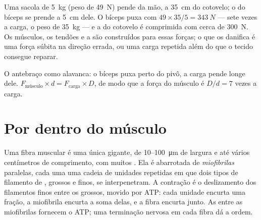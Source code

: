 \begin{example}\label{ex:g10:muscles-and-joints:bag}
Uma sacola de \qty{5}{kg} (peso de \qty{49}{N}) pende da mão, a
\qty{35}{cm} do cotovelo; o  do bíceps se prende a \qty{5}{cm}
dele. O bíceps puxa com $49 \times 35/5 = \qty{343}{N}$ --- sete vezes
a carga, o peso de \qty{35}{kg} --- e a  do cotovelo é
comprimida com cerca de \qty{300}{N}. Os músculos, os tendões e a
 são construídos para essas forças; o que os danifica é uma
força súbita na direção errada, ou uma carga repetida além do que o
tecido consegue reparar.
\end{example}

\begin{omfigure}

{\small O antebraço como alavanca: o bíceps puxa perto do pivô, a carga
pende longe dele. $F_{\text{músculo}} \times d =
F_{\text{carga}} \times D$, de modo que a força do músculo é $D/d = 7$
vezes a carga.}
\end{omfigure}

\section{Por dentro do músculo}

\begin{proposition}\label{prop:g10:muscles-and-joints:fibre}
Uma fibra muscular é uma única  gigante, de
\num{10}--\qty{100}{\micro m} de largura e até vários centímetros de
comprimento, com muitos . Ela é abarrotada de
\emph{miofibrilas} paralelas, cada uma uma cadeia de unidades
repetidas em que dois tipos de filamento de , grossos e finos,
se interpenetram. A contração é o deslizamento dos filamentos finos
entre os grossos, movido por ATP: cada unidade encurta uma fração, a
miofibrila encurta a soma delas, e a fibra encurta junto. As
 entre as miofibrilas fornecem o ATP; uma terminação
nervosa em cada fibra dá a ordem.
\end{proposition}
\admitted

